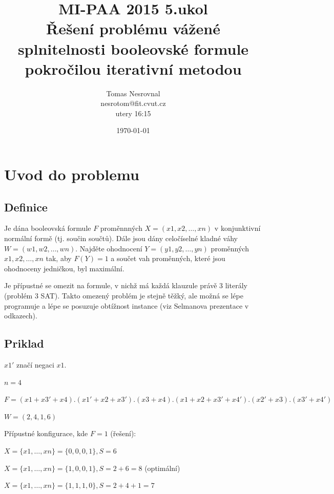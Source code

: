 \documentclass[12pt,a4paper]{article}
\begin{document}
\title{MI-PAA 2015 5.ukol \\
Řešení problému vážené splnitelnosti booleovské formule pokročilou iterativní metodou
}
\author{Tomas Nesrovnal\\nesrotom@fit.cvut.cz\\utery 16:15}
\date{\today}
\maketitle

\newpage


\section{Uvod do problemu}

\subsection{Definice}
Je dána booleovská formule $F$ proměnnných $X=(x1, x2, … , xn)$ v konjunktivní normální formě (tj. součin součtů). Dále jsou dány celočíselné kladné váhy $W=(w1, w2, … , wn)$. Najděte ohodnocení $Y=(y1, y2, … , yn)$ proměnných $x1, x2, … , xn$ tak, aby $F(Y)=1$ a součet vah proměnných, které jsou ohodnoceny jedničkou, byl maximální.

Je přípustné se omezit na formule, v nichž má každá klauzule právě 3 literály (problém 3 SAT). Takto omezený problém je stejně těžký, ale možná se lépe programuje a lépe se posuzuje obtížnost instance (viz Selmanova prezentace v odkazech).

\subsection{Priklad}
$x1'$ značí negaci $x1$.

$n = 4$

$F = (x1 + x3' + x4).(x1' + x2 + x3').(x3 + x4).(x1 + x2 + x3' + x4').(x2' + x3).(x3' + x4')$ 

$W = (2, 4, 1, 6)$


Přípustné konfigurace, kde $F=1$ (řešení):

$X = \{x1, …,xn\} = \{0, 0, 0, 1\}, S = 6$

$X = \{x1, …,xn\} = \{1, 0, 0, 1\}, S = 2 + 6 = 8 $ (optimální)

$X = \{x1, …,xn\} = \{1, 1, 1, 0\}, S = 2 + 4 + 1 = 7$
\end{document}
